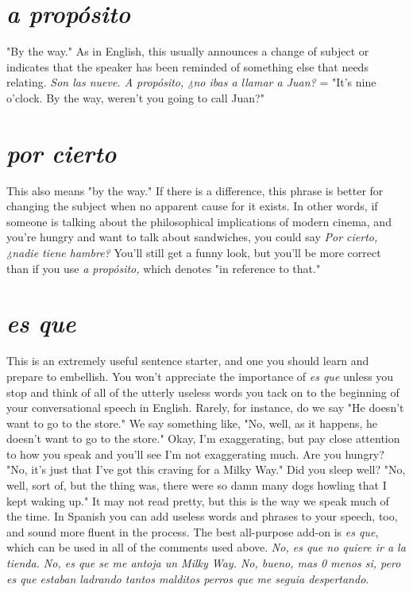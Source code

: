 \documentclass[14pt,a4paper,oneside]{memoir}
\begin{document}
\section{\emph{a propósito}}

"By the way." As in English, this usually announces a change
of subject or indicates that the speaker has been reminded of something else that needs relating. \emph{Son las nueve. A propósito, ¿no ibas a
	llamar a Juan?} = "It's nine o'clock. By the way, weren't you going to
call Juan?"

\section{\emph{por cierto}}

This also means "by the way." If there is a difference, this
phrase is better for changing the subject when no apparent cause for
it exists. In other words, if someone is talking about the philosophical
implications of modern cinema, and you're hungry and want to talk
about sandwiches, you could say \emph{Por cierto, ¿nadie tiene hambre?}
You'll still get a funny look, but you'll be more correct than if you use
\emph{a propósito,} which denotes "in reference to that."

\section{\emph{es que}}

This is an extremely useful sentence starter, and one you
should learn and prepare to embellish. You won't appreciate the importance of \emph{es que} unless you stop and think of all of the utterly useless
words you tack on to the beginning of your conversational speech in
English. Rarely, for instance, do we say "He doesn't want to go to the
store." We say something like, "No, well, as it happens, he doesn't
want to go to the store." Okay, I'm exaggerating, but pay close attention to how you speak and you'll see I'm not exaggerating much. Are
you hungry? "No, it's just that I've got this craving for a Milky Way."
Did you sleep well? "No, well, sort of, but the thing was, there were
so damn many dogs howling that I kept waking up." It may not read
pretty, but this is the way we speak much of the time. In Spanish you
can add useless words and phrases to your speech, too, and sound more
fluent in the process. The best all-purpose add-on is \emph{es que}, which can
be used in all of the comments used above. \emph{No, es que no quiere ir a
	la tienda. No, es que se me antoja un Milky Way. No, bueno, mas 0
	menos si, pero es que estaban ladrando tantos malditos perros que
	me seguia despertando}.
\end{document}

